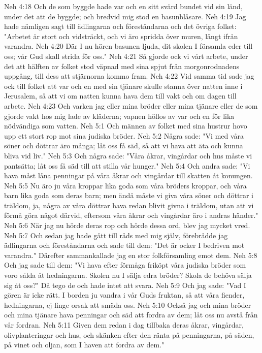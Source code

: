 Neh 4:18  Och de som byggde hade var och en sitt svärd bundet vid sin länd, under det att de byggde; och bredvid mig stod en basunblåsare.
Neh 4:19  Jag hade nämligen sagt till ädlingarna och föreståndarna och det övriga folket: "Arbetet är stort och vidsträckt, och vi äro spridda över muren, långt ifrån varandra.
Neh 4:20  Där I nu hören basunen ljuda, dit skolen I församla eder till oss; vår Gud skall strida för oss."
Neh 4:21  Så gjorde ock vi vårt arbete, under det att hälften av folket stod väpnad med sina spjut från morgonrodnadens uppgång, till dess att stjärnorna kommo fram.
Neh 4:22  Vid samma tid sade jag ock till folket att var och en med sin tjänare skulle stanna över natten inne i Jerusalem, så att vi om natten kunna hava dem till vakt och om dagen till arbete.
Neh 4:23  Och varken jag eller mina bröder eller mina tjänare eller de som gjorde vakt hos mig lade av kläderna; vapnen höllos av var och en för lika nödvändiga som vatten.
Neh 5:1  Och männen av folket med sina hustrur hovo upp ett stort rop mot sina judiska bröder.
Neh 5:2  Några sade: "Vi med våra söner och döttrar äro många; låt oss få säd, så att vi hava att äta och kunna bliva vid liv."
Neh 5:3  Och några sade: "Våra åkrar, vingårdar och hus måste vi pantsätta; låt oss få säd till att stilla vår hunger."
Neh 5:4  Och andra sade: "Vi hava måst låna penningar på våra åkrar och vingårdar till skatten åt konungen.
Neh 5:5  Nu äro ju våra kroppar lika goda som våra bröders kroppar, och våra barn lika goda som deras barn; men ändå måste vi giva våra söner och döttrar i träldom, ja, några av våra döttrar hava redan blivit givna i träldom, utan att vi förmå göra något därvid, eftersom våra åkrar och vingårdar äro i andras händer."
Neh 5:6  När jag nu hörde deras rop och hörde dessa ord, blev jag mycket vred.
Neh 5:7  Och sedan jag hade gått till råds med mig själv, förebrådde jag ädlingarna och föreståndarna och sade till dem: "Det är ocker I bedriven mot varandra." Därefter sammankallade jag en stor folkförsamling emot dem.
Neh 5:8  Och jag sade till dem: "Vi hava efter förmåga friköpt våra judiska bröder som voro sålda åt hedningarna. Skolen nu I sälja edra bröder? Skola de behöva sälja sig åt oss?" Då tego de och hade intet att svara.
Neh 5:9  Och jag sade: "Vad I gören är icke rätt. I borden ju vandra i vår Guds fruktan, så att våra fiender, hedningarna, ej finge orsak att smäda oss.
Neh 5:10  Också jag och mina bröder och mina tjänare hava penningar och säd att fordra av dem; låt oss nu avstå från vår fordran.
Neh 5:11  Given dem redan i dag tillbaka deras åkrar, vingårdar, olivplanteringar och hus, och skänken efter den ränta på penningarna, på säden, på vinet och oljan, som I haven att fordra av dem."
